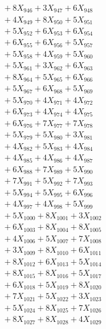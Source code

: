 \documentclass[a4paper,10pt]{article}
\begin{document}
{\begin{align}
&\;  + 8 X_{946} + 3 X_{947} + 6 X_{948} \\[0.3ex]
&\;  + 4 X_{949} + 8 X_{950} + 5 X_{951} \\[0.3ex]
&\;  + 5 X_{952} + 6 X_{953} + 6 X_{954} \\[0.3ex]
&\;  + 6 X_{955} + 6 X_{956} + 5 X_{957} \\[0.3ex]
&\;  + 5 X_{958} + 4 X_{959} + 5 X_{960} \\[0.3ex]
&\;  + 5 X_{961} + 3 X_{962} + 6 X_{963} \\[0.3ex]
&\;  + 8 X_{964} + 5 X_{965} + 6 X_{966} \\[0.3ex]
&\;  + 5 X_{967} + 6 X_{968} + 5 X_{969} \\[0.5ex]\allowbreak
&\;  + 5 X_{970} + 4 X_{971} + 4 X_{972} \\[0.3ex]
&\;  + 6 X_{973} + 4 X_{974} + 4 X_{975} \\[0.3ex]
&\;  + 6 X_{976} + 7 X_{977} + 7 X_{978} \\[0.3ex]
&\;  + 5 X_{979} + 5 X_{980} + 3 X_{981} \\[0.3ex]
&\;  + 4 X_{982} + 5 X_{983} + 4 X_{984} \\[0.3ex]
&\;  + 4 X_{985} + 4 X_{986} + 4 X_{987} \\[0.3ex]
&\;  + 6 X_{988} + 7 X_{989} + 5 X_{990} \\[0.3ex]
&\;  + 7 X_{991} + 5 X_{992} + 7 X_{993} \\[0.3ex]
&\;  + 5 X_{994} + 5 X_{995} + 6 X_{996} \\[0.3ex]
&\;  + 4 X_{997} + 4 X_{998} + 5 X_{999} \\[0.5ex]\allowbreak
&\;  + 5 X_{1000} + 8 X_{1001} + 3 X_{1002} \\[0.3ex]
&\;  + 6 X_{1003} + 8 X_{1004} + 8 X_{1005} \\[0.3ex]
&\;  + 4 X_{1006} + 5 X_{1007} + 7 X_{1008} \\[0.3ex]
&\;  + 3 X_{1009} + 8 X_{1010} + 6 X_{1011} \\[0.3ex]
&\;  + 8 X_{1012} + 6 X_{1013} + 5 X_{1014} \\[0.3ex]
&\;  + 8 X_{1015} + 8 X_{1016} + 5 X_{1017} \\[0.3ex]
&\;  + 6 X_{1018} + 5 X_{1019} + 8 X_{1020} \\[0.3ex]
&\;  + 7 X_{1021} + 5 X_{1022} + 3 X_{1023} \\[0.3ex]
&\;  + 5 X_{1024} + 8 X_{1025} + 7 X_{1026} \\[0.3ex]
&\;  + 8 X_{1027} + 8 X_{1028} + 4 X_{1029} \\[0.5ex]\allowbreak

\end{align}}
\end{document}
